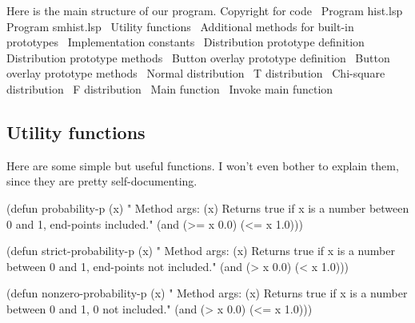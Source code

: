Here is the main structure of our program. 
\nwenddocs{}\endmoddef
\LA{}Copyright for code~{\nwtagstyle{}}\RA{}
\LA{}Program hist.lsp~{\nwtagstyle{}}\RA{}
\LA{}Program smhist.lsp~{\nwtagstyle{}}\RA{}
\LA{}Utility functions~{\nwtagstyle{}}\RA{}
\LA{}Additional methods for built-in prototypes~{\nwtagstyle{}}\RA{}
\LA{}Implementation constants~{\nwtagstyle{}}\RA{}
\LA{}Distribution prototype definition~{\nwtagstyle{}}\RA{}
\LA{}Distribution prototype methods~{\nwtagstyle{}}\RA{}
\LA{}Button overlay prototype definition~{\nwtagstyle{}}\RA{}
\LA{}Button overlay prototype methods~{\nwtagstyle{}}\RA{}
\LA{}Normal distribution~{\nwtagstyle{}}\RA{}
\LA{}T distribution~{\nwtagstyle{}}\RA{}
\LA{}Chi-square distribution~{\nwtagstyle{}}\RA{}
\LA{}F distribution~{\nwtagstyle{}}\RA{}
\LA{}Main function~{\nwtagstyle{}}\RA{}
\LA{}Invoke main function~{\nwtagstyle{}}\RA{}
\nwendcode{}\nwdocspar

\subsection{Utility functions}
\label{sec:utils}
Here are some simple but useful functions. I won't even bother to
explain them, since they are pretty self-documenting. 

\nwenddocs{}\endmoddef
(defun probability-p (x)
" Method args: (x)
Returns true if x is a number between 0 and 1, end-points included."
  (and (>= x 0.0) (<= x 1.0)))

(defun strict-probability-p (x)
" Method args: (x)
Returns true if x is a number between 0 and 1, end-points not included."
  (and (> x 0.0) (< x 1.0)))

(defun nonzero-probability-p (x)
" Method args: (x)
Returns true if x is a number between 0 and 1, 0 not included."
  (and (> x 0.0) (<= x 1.0)))

